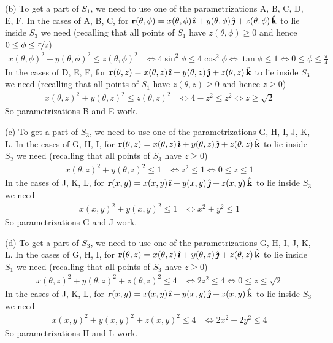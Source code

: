 \begin{solution}
(b) To get a part of $S_1$, we need to use one of the parametrizations
A, B, C, D, E, F. 
In the cases of A, B, C,  for $\mathbf{r}(\theta, \phi)
=x(\theta, \phi)\,\hat{\pmb{\imath}}+ y(\theta, \phi)\,\hat{\pmb{\jmath}}+z(\theta, \phi)\,\hat{\mathbf{k}}$
to lie inside $S_3$ we need (recalling that all points of $S_1$ have $z(\theta,\phi)\ge 0$ and hence $0\le\phi\le\nicefrac{\pi}{2}$)
\begin{align*}
x(\theta, \phi)^2 + y(\theta, \phi)^2 \le z(\theta,\phi)^2
&\iff 4\sin^2\phi \le 4\cos^2\phi
\iff \tan\phi \le 1
\iff 0\le\phi\le \frac{\pi}{4} 
\end{align*}
In the cases of D, E, F,  for $\mathbf{r}(\theta, z)
=x(\theta, z)\,\hat{\pmb{\imath}}+ y(\theta, z)\,\hat{\pmb{\jmath}}+z(\theta, z)\,\hat{\mathbf{k}}$
to lie inside $S_3$ we need (recalling that all points of $S_1$ have $z(\theta,z)\ge 0$ and hence $z\ge 0$)
\begin{align*}
x(\theta, z)^2 + y(\theta, z)^2 \le z(\theta, z)^2
&\iff 4-z^2 \le z^2
\iff z \ge \sqrt{2}
\end{align*}
So parametrizations B and E work.

(c) To get a part of $S_3$, we need to use one of the parametrizations
G, H, I, J, K, L. 
In the cases of G, H, I,  for $\mathbf{r}(\theta, z)
=x(\theta, z)\,\hat{\pmb{\imath}}+ y(\theta, z)\,\hat{\pmb{\jmath}}+z(\theta, z)\,\hat{\mathbf{k}}$
to lie inside $S_2$ we need  (recalling that all points of $S_3$ have $z\ge 0$)
\begin{align*}
x(\theta, z)^2 + y(\theta, z)^2 \le 1
&\iff z^2 \le 1
\iff 0\le z\le 1
\end{align*}
In the cases of J, K, L,  for $\mathbf{r}(x, y)
=x(x, y)\,\hat{\pmb{\imath}}+ y(x, y)\,\hat{\pmb{\jmath}}+z(x, y)\,\hat{\mathbf{k}}$
to lie inside $S_3$ we need 
\begin{align*}
x(x, y)^2 + y(x, y)^2 \le 1
&\iff x^2+y^2 \le 1
\end{align*}
So parametrizations G and J work.

(d) To get a part of $S_3$, we need to use one of the parametrizations
G, H, I, J, K, L. 
In the cases of G, H, I,  for $\mathbf{r}(\theta, z)
=x(\theta, z)\,\hat{\pmb{\imath}}+ y(\theta, z)\,\hat{\pmb{\jmath}}+z(\theta, z)\,\hat{\mathbf{k}}$
to lie inside $S_1$ we need  (recalling that all points of $S_3$ have $z\ge 0$)
\begin{align*}
x(\theta, z)^2 + y(\theta, z)^2+ z(\theta, z)^2 \le 4
&\iff 2z^2 \le 4
\iff 0\le z\le \sqrt{2}
\end{align*}
In the cases of J, K, L,  for $\mathbf{r}(x, y)
=x(x, y)\,\hat{\pmb{\imath}}+ y(x, y)\,\hat{\pmb{\jmath}}+z(x, y)\,\hat{\mathbf{k}}$
to lie inside $S_3$ we need 
\begin{align*}
x(x, y)^2 + y(x, y)^2 + z(x, y)^2 \le 4
&\iff 2x^2+2y^2 \le 4
\end{align*}
So parametrizations H and L work.
\end{solution}





